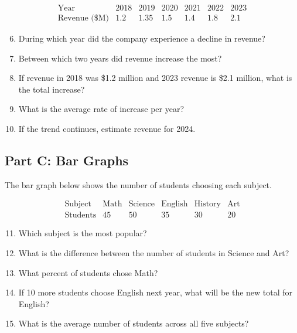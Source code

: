 \documentclass[14pt]{extarticle}
\begin{document}

\[
\begin{array}{c|cccccc}
\text{Year} & 2018 & 2019 & 2020 & 2021 & 2022 & 2023\\ \hline
\text{Revenue (\$M)} & 1.2 & 1.35 & 1.5 & 1.4 & 1.8 & 2.1
\end{array}
\]

\begin{enumerate}
  \setcounter{enumi}{5}
  \item During which year did the company experience a decline in revenue?
  \item Between which two years did revenue increase the most?
  \item If revenue in 2018 was \$1.2 million and 2023 revenue is \$2.1 million, what is the total increase?
  \item What is the average rate of increase per year?
  \item If the trend continues, estimate revenue for 2024.
\end{enumerate}

\subsection*{Part C: Bar Graphs}
The bar graph below shows the number of students choosing each subject.


\[
\begin{array}{c|ccccc}
\text{Subject} & \text{Math} & \text{Science} & \text{English} & \text{History} & \text{Art}\\ \hline
\text{Students} & 45 & 50 & 35 & 30 & 20
\end{array}
\]

\begin{enumerate}
  \setcounter{enumi}{10}
  \item Which subject is the most popular?
  \item What is the difference between the number of students in Science and Art?
  \item What percent of students chose Math?
  \item If 10 more students choose English next year, what will be the new total for English?
  \item What is the average number of students across all five subjects?
\end{enumerate}
\end{document}
